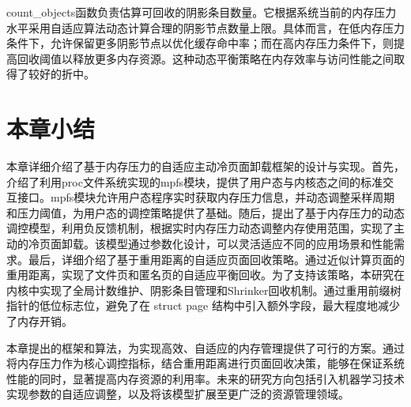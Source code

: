 count\_objects函数负责估算可回收的阴影条目数量。它根据系统当前的内存压力水平采用自适应算法动态计算合理的阴影节点数量上限。具体而言，在低内存压力条件下，允许保留更多阴影节点以优化缓存命中率；而在高内存压力条件下，则提高回收阈值以释放更多内存资源。这种动态平衡策略在内存效率与访问性能之间取得了较好的折中。





\section{本章小结}
\label{sec:本章小结}

本章详细介绍了基于内存压力的自适应主动冷页面卸载框架的设计与实现。首先，介绍了利用proc文件系统实现的mpfs模块，提供了用户态与内核态之间的标准交互接口。mpfs模块允许用户态程序实时获取内存压力信息，并动态调整采样周期和压力阈值，为用户态的调控策略提供了基础。随后，提出了基于内存压力的动态调控模型，利用负反馈机制，根据实时内存压力动态调整内存使用范围，实现了主动的冷页面卸载。该模型通过参数化设计，可以灵活适应不同的应用场景和性能需求。最后，详细介绍了基于重用距离的自适应页面回收策略。通过近似计算页面的重用距离，实现了文件页和匿名页的自适应平衡回收。为了支持该策略，本研究在内核中实现了全局计数维护、阴影条目管理和Shrinker回收机制。通过重用前缀树指针的低位标志位，避免了在 struct page 结构中引入额外字段，最大程度地减少了内存开销。

本章提出的框架和算法，为实现高效、自适应的内存管理提供了可行的方案。通过将内存压力作为核心调控指标，结合重用距离进行页面回收决策，能够在保证系统性能的同时，显著提高内存资源的利用率。未来的研究方向包括引入机器学习技术实现参数的自适应调整，以及将该模型扩展至更广泛的资源管理领域。
